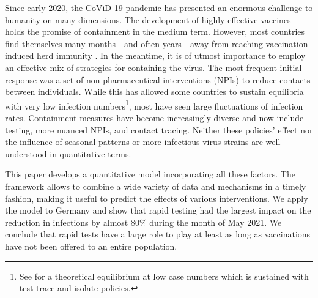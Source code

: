 


Since early 2020, the CoViD-19 pandemic has presented an enormous challenge to humanity
on many dimensions. The development of highly effective vaccines holds the promise of
containment in the medium term. However, most countries find themselves many
months---and often years---away from reaching vaccination-induced herd immunity
\citep{Swaminathan2021}. In the meantime, it is of utmost importance to employ an effective
mix of strategies for containing the virus. The most frequent initial response was a set
of non-pharmaceutical interventions (NPIs) to reduce contacts between individuals. While
this has allowed some countries to sustain equilibria with very low infection
numbers\footnote{See \citet{Contreras2021} for a theoretical equilibrium at low case
    numbers which is sustained with test-trace-and-isolate policies.}, most have seen large
fluctuations of infection rates. Containment measures have become increasingly diverse
and now include testing, more nuanced NPIs, and contact tracing. Neither these policies'
effect nor the influence of seasonal patterns or more infectious virus strains are well
understood in quantitative terms.

This paper develops a quantitative model incorporating all these factors. The framework
allows to combine a wide variety of data and mechanisms in a timely fashion, making it
useful to predict the effects of various interventions. We apply the model to Germany
and show that rapid testing had the largest impact on the reduction in infections by
almost 80\% during the month of May 2021. We conclude that rapid tests have a large role
to play at least as long as vaccinations have not been offered to an entire population.

